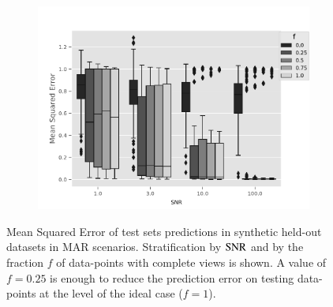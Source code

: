 \begin{figure}[htb]
\centering
\begin{subfigure}{.49\textwidth}
	\centering
        \includegraphics[width=\textwidth]{./tex/fig/mar_pred_err_boxplot.pdf}
\end{subfigure}%
\caption{
Mean Squared Error of test sets predictions in synthetic held-out datasets in MAR scenarios.
Stratification by $\operatorname{SNR}$ and by the fraction $f$ of data-points with complete views is shown.
A value of $f = 0.25$ is enough to reduce the prediction error on testing data-points at the level of the ideal case ($f=1$).
}
\label{fig:synthetic_benchmark_pred_box}
\end{figure}

